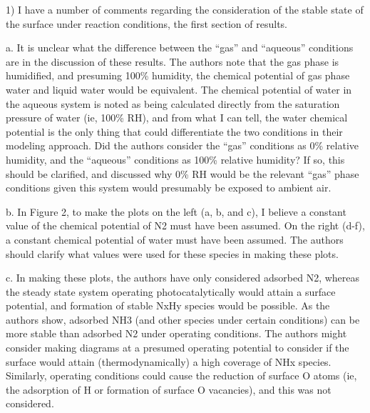 
1)       I have a number of comments regarding the consideration of the stable state of the surface under reaction conditions, the first section of results.

a.      It is unclear what the difference between the “gas” and “aqueous” conditions are in the discussion of these results.  The authors note that the gas phase is humidified, and presuming 100\% humidity, the chemical potential of gas phase water and liquid water would be equivalent. The chemical potential of water in the aqueous system is noted as being calculated directly from the saturation pressure of water (ie, 100\% RH), and from what I can tell, the water chemical potential is the only thing that could differentiate the two conditions in their modeling approach.   Did the authors consider the “gas” conditions as 0\% relative humidity, and the “aqueous” conditions as 100\% relative humidity?  If so, this should be clarified, and discussed why 0\% RH would be the relevant “gas” phase conditions given this system would presumably be exposed to ambient air.


b.      In Figure 2, to make the plots on the left (a, b, and c), I believe a constant value of the chemical potential of N2 must have been assumed.  On the right (d-f), a constant chemical potential of water must have been assumed.  The authors should clarify what values were used for these species in making these plots.


c.      In making these plots, the authors have only considered adsorbed N2, whereas the steady state system operating photocatalytically would attain a surface potential, and formation of stable NxHy species would be possible.  As the authors show, adsorbed NH3 (and other species under certain conditions) can be more stable than adsorbed N2 under operating conditions.  The authors might consider making diagrams at a presumed operating potential to consider if the surface would attain (thermodynamically) a high coverage of NHx species.  Similarly, operating conditions could cause the reduction of surface O atoms (ie, the adsorption of H or formation of surface O vacancies), and this was not considered.

